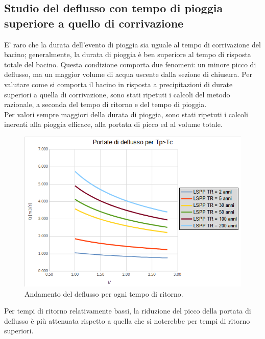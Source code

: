 \subsection{Studio del deflusso con tempo di pioggia superiore a quello di corrivazione}
E' raro che la durata dell'evento di pioggia sia uguale al tempo di corrivazione del bacino; generalmente, la durata di pioggia è ben superiore al tempo di risposta totale del bacino. Questa condizione comporta due fenomeni: un minore picco di deflusso, ma un maggior volume di acqua uscente dalla sezione di chiusura.
Per valutare come si comporta il bacino in risposta a precipitazioni di durate superiori a quella di corrivazione, sono stati ripetuti i calcoli del metodo razionale, a seconda del tempo di ritorno e del tempo di pioggia.\\
Per valori sempre maggiori della durata di pioggia, sono stati ripetuti i calcoli inerenti alla pioggia efficace, alla portata di picco ed al volume totale.
\begin{figure}[H]  \centering
    \includegraphics[scale=0.75]{immagini/deflusso_tp_tc.png}
    \caption{Andamento del deflusso per ogni tempo di ritorno.}
    \label{metodo_razionale_cn_c}
\end{figure}
Per tempi di ritorno relativamente bassi, la riduzione del picco della portata di deflusso è più attenuata rispetto a quella che si noterebbe per tempi di ritorno superiori.